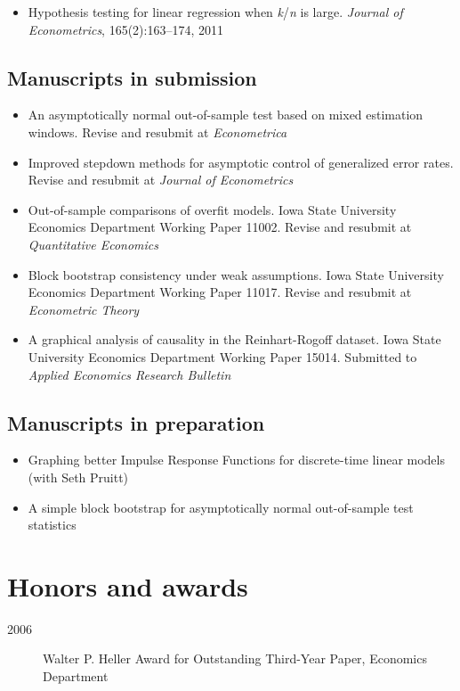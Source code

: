 \documentclass[12pt]{article}%
\newcommand{\allcaps}[1]{\textls{\MakeUppercase{#1}}}
\begin{document}
\begin{itemize}
\item Hypothesis testing for linear regression when
\textit{k}/\textit{n} is large. \textit{Journal of Econometrics},
165(2):163--174, 2011
\end{itemize}

\subsection*{Manuscripts in submission}

\begin{itemize}
\item An asymptotically normal out-of-sample test based on mixed
  estimation windows. Revise and resubmit at \textit{Econometrica}
\item Improved stepdown methods for asymptotic control of generalized
  error rates. Revise and resubmit at \textit{Journal of Econometrics}
\item Out-of-sample comparisons of overfit models. Iowa State University Economics Department
  Working Paper 11002. Revise and resubmit at
  \textit{Quantitative Economics}
\item Block bootstrap consistency under weak assumptions.
  Iowa State University Economics Department Working Paper 11017. Revise and resubmit at
  \textit{Econometric Theory}
\item A graphical analysis of causality in the Reinhart-Rogoff
  dataset. Iowa State University Economics Department Working Paper 15014. Submitted to
  \textit{Applied Economics Research Bulletin}
\end{itemize}

\subsection*{Manuscripts in preparation}
\begin{itemize}
\item Graphing better Impulse Response Functions for discrete-time
  linear models (with Seth Pruitt)
\item A simple block bootstrap for asymptotically normal out-of-sample
  test statistics
\end{itemize}

\section*{Honors and awards}

\begin{description}
\item[2006] Walter P. Heller Award for Outstanding Third-Year Paper,
\allcaps{UCSD} Economics Department
\end{description}
\end{document}
